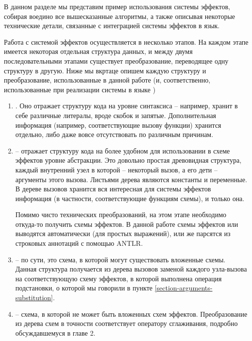 В данном разделе мы представим пример использования системы эффектов, собирая воедино все вышесказанные алгоритмы, а также описывая некоторые технические детали, связанные с интеграцией системы эффектов в язык. 

Работа с системой эффектов осуществляется в несколько этапов. На каждом этапе имеется некоторая отдельная структура данных, и между двумя последовательными этапами существует преобразование, переводящее одну структуру в другую. Ниже мы вкртаце опишем каждую структуру и преобразование, использованные в данной работе (и, соответственно, использованные при реализации системы в языке )

\begin{enumerate}
	\item {}. Оно отражает структуру кода на уровне синтаксиса -- например, хранит в себе различные литералы, вроде скобок и запятые. Дополнительная информация (например, соответствующие вызову функции) хранится отдельно, либо даже вовсе отсутствовать по различным причинам.
	
	\item {} -- отражает структуру кода на более удобном для использовании в схеме эффектов уровне абстракции. Это довольно простая древовидная структура, каждый внутренний узел в которой -- некоторый вызов, а его дети -- аргументы этого вызова. Листьями дерева являются константы и переменные. В дереве вызовов хранится вся интересная для системы эффектов информация (в частности, соответствующие функциям схемы), и только она.
	
	Помимо чисто технических преобразований, на этом этапе необходимо откуда-то получить схемы эффектов. В данной работе схемы эффектов или выводятся автоматически (для простых выражений), или же парсятся из строковых аннотаций с помощью ANTLR.
	
	\item {} -- по сути, это схема, в которой могут существовать вложенные схемы. Данная структура получается из дерева вызовов заменой каждого узла-вызова на соответствующую схему эффектов, в которой выполнена операция подстановки, о которой мы говорили в пункте \ref{section-arguments-substitution}.
	
	\item {} -- схема, в которой не может быть вложенных схем эффектов. Преобразование из дерева схем в точности соответствует оператору сглаживания, подробно обсуждавшемуся в главе 2.
	

\end{enumerate}
